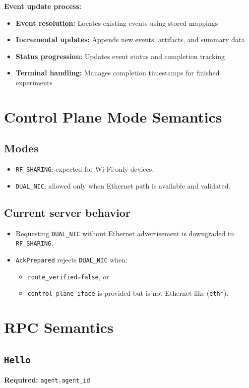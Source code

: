 \documentclass[11pt,a4paper]{article}
\begin{document}
\textbf{Event update process:}
\begin{itemize}
  \item \textbf{Event resolution:} Locates existing events using stored mappings
  \item \textbf{Incremental updates:} Appends new events, artifacts, and summary data
  \item \textbf{Status progression:} Updates event status and completion tracking
  \item \textbf{Terminal handling:} Manages completion timestamps for finished experiments
\end{itemize}

\section{Control Plane Mode Semantics}
\subsection{Modes}
\begin{itemize}
  \item \texttt{RF\_SHARING}: expected for Wi-Fi-only devices.
  \item \texttt{DUAL\_NIC}: allowed only when Ethernet path is available and validated.
\end{itemize}

\subsection{Current server behavior}
\begin{itemize}
  \item Requesting \texttt{DUAL\_NIC} without Ethernet advertisement is downgraded to \texttt{RF\_SHARING}.
  \item \texttt{AckPrepared} rejects \texttt{DUAL\_NIC} when:
    \begin{itemize}
      \item \texttt{route\_verified=false}, or
      \item \texttt{control\_plane\_iface} is provided but is not Ethernet-like (\texttt{eth*}).
    \end{itemize}
\end{itemize}

\section{RPC Semantics}
\subsection{\texttt{Hello}}
\textbf{Required:} \texttt{agent.agent\_id}
\end{document}

